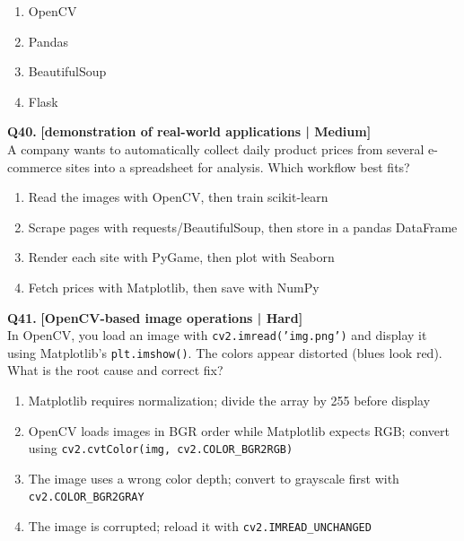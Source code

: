 \begin{enumerate}[label=(\alph*),topsep=2pt,itemsep=1pt,partopsep=0pt,parsep=0pt]
    \item \relax OpenCV
    \item \relax Pandas
    \item \relax BeautifulSoup
    \item \relax Flask
\end{enumerate}
\vspace{2mm}

\noindent\textbf{Q40.} \hfill {\small\color{LPUOrange}\textbf{[demonstration of real-world applications | Medium]}}\\[2pt]
A company wants to automatically collect daily product prices from several e-commerce sites into a spreadsheet for analysis. Which workflow best fits?

\begin{enumerate}[label=(\alph*),topsep=2pt,itemsep=1pt,partopsep=0pt,parsep=0pt]
    \item \relax Read the images with OpenCV, then train scikit-learn
    \item \relax Scrape pages with requests/BeautifulSoup, then store in a pandas DataFrame
    \item \relax Render each site with PyGame, then plot with Seaborn
    \item \relax Fetch prices with Matplotlib, then save with NumPy
\end{enumerate}
\vspace{2mm}

\noindent\textbf{Q41.} \hfill {\small\color{LPUOrange}\textbf{[OpenCV-based image operations | Hard]}}\\[2pt]
In OpenCV, you load an image with \texttt{cv2.imread('img.png')} and display it using Matplotlib's \texttt{plt.imshow()}. The colors appear distorted (blues look red). What is the root cause and correct fix?

\begin{enumerate}[label=(\alph*),topsep=2pt,itemsep=1pt,partopsep=0pt,parsep=0pt]
    \item \relax Matplotlib requires normalization; divide the array by 255 before display
    \item \relax OpenCV loads images in BGR order while Matplotlib expects RGB; convert using \texttt{cv2.cvtColor(img, cv2.COLOR\_BGR2RGB)}
    \item \relax The image uses a wrong color depth; convert to grayscale first with \texttt{cv2.COLOR\_BGR2GRAY}
    \item \relax The image is corrupted; reload it with \texttt{cv2.IMREAD\_UNCHANGED}
\end{enumerate}
\vspace{2mm}

